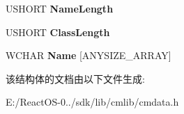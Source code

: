 \begin{DoxyCompactItemize}
\mbox{\label{struct___c_m___k_e_y___n_o_d_e_a9862fff2882138b812a49027f1bda3bb}} 
U\+S\+H\+O\+RT {\bfseries Name\+Length}
\item 
\mbox{\label{struct___c_m___k_e_y___n_o_d_e_a9c9b695378c12c51f8aa7b8313e6998b}} 
U\+S\+H\+O\+RT {\bfseries Class\+Length}
\item 
\mbox{\label{struct___c_m___k_e_y___n_o_d_e_a49767681845aa92ff3d9bc8b35b8b003}} 
W\+C\+H\+AR {\bfseries Name} \mbox{[}A\+N\+Y\+S\+I\+Z\+E\+\_\+\+A\+R\+R\+AY\mbox{]}
\end{DoxyCompactItemize}


该结构体的文档由以下文件生成\+:\begin{DoxyCompactItemize}
\item 
E\+:/\+React\+O\+S-\/0../sdk/lib/cmlib/cmdata.\+h\end{DoxyCompactItemize}

